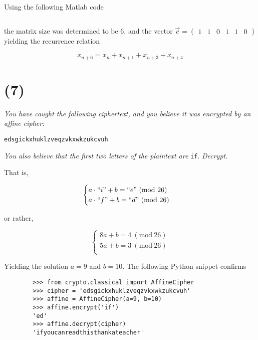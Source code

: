 \documentclass[12pt]{article}
\renewcommand{\mod}[1]{\mathrm{mod}\ #1}
\renewcommand{\pmod}[1]{\ (\mod{#1})}
\begin{document}
    Using the following Matlab code

    \inputminted[breaklines=true]{matlab}{../snippets/matlab/LFSR.m}

    the matrix size was determined to be $6$, and the vector $\vec{c} = \begin{pmatrix}1 & 1 & 0 & 1 & 1 & 0\end{pmatrix}$ yielding the recurrence relation

    $$ x_{n + 6} = x_n + x_{n + 1} + x_{n + 3} + x_{n + 4}$$

\section*{(7)} \textit{You have caught the following ciphertext, and you believe it was encrypted by an affine cipher:}

    \begin{center}
      \texttt{edsgickxhuklzveqzvkxwkzukcvuh}
    \end{center}

    \textit{You also believe that the first two letters of the plaintext are} \texttt{if}. \textit{Decrypt.}

    That is,

    $$\begin{cases}
    a \cdot ``i" + b = ``e" \pmod{26}\\
    a \cdot ``f" + b = ``d" \pmod{26}\\
    \end{cases}$$

    or rather,

    $$\begin{cases}
    8a + b = 4 \pmod{26}\\
    5a + b = 3 \pmod{26}\\
    \end{cases}$$

    Yielding the solution $a = 9$ and $b = 10$. The following Python snippet confirms

    \begin{verbatim}
        >>> from crypto.classical import AffineCipher
        >>> cipher = 'edsgickxhuklzveqzvkxwkzukcvuh'
        >>> affine = AffineCipher(a=9, b=10)
        >>> affine.encrypt('if')
        'ed'
        >>> affine.decrypt(cipher)
        'ifyoucanreadthisthankateacher'
    \end{verbatim}
\end{document}
